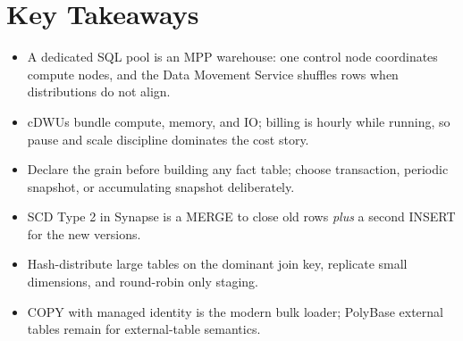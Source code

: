 \section*{Key Takeaways}
\begin{itemize}
    \item A dedicated SQL pool is an MPP warehouse: one control node coordinates compute nodes, and the Data Movement Service shuffles rows when distributions do not align.
    \item cDWUs bundle compute, memory, and IO; billing is hourly while running, so pause and scale discipline dominates the cost story.
    \item Declare the grain before building any fact table; choose transaction, periodic snapshot, or accumulating snapshot deliberately.
    \item SCD Type 2 in Synapse is a MERGE to close old rows \emph{plus} a second INSERT for the new versions.
    \item Hash-distribute large tables on the dominant join key, replicate small dimensions, and round-robin only staging.
    \item COPY with managed identity is the modern bulk loader; PolyBase external tables remain for external-table semantics.
\end{itemize}

